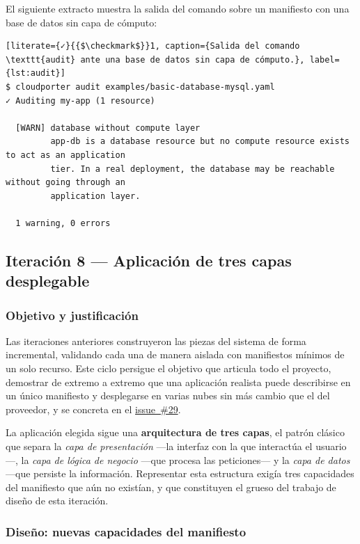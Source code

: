 El siguiente extracto muestra la salida del comando sobre un manifiesto con una base de datos
sin capa de cómputo:

\begin{lstlisting}[literate={✓}{{$\checkmark$}}1, caption={Salida del comando \texttt{audit} ante una base de datos sin capa de cómputo.}, label={lst:audit}]
$ cloudporter audit examples/basic-database-mysql.yaml
✓ Auditing my-app (1 resource)

  [WARN] database without compute layer
         app-db is a database resource but no compute resource exists to act as an application
         tier. In a real deployment, the database may be reachable without going through an
         application layer.

  1 warning, 0 errors
\end{lstlisting}

\subsection{Iteración 8 — Aplicación de tres capas desplegable}
\label{sec:iter8}

\subsubsection{Objetivo y justificación}

Las iteraciones anteriores construyeron las piezas del sistema de forma incremental, validando
cada una de manera aislada con manifiestos mínimos de un solo recurso. Este ciclo persigue el
objetivo que articula todo el proyecto, demostrar de extremo a extremo que una aplicación
realista puede describirse en un único manifiesto y desplegarse en varias nubes sin más cambio
que el del proveedor, y se concreta en el
\href{https://github.com/lucpez/cloudporter/issues/29}{issue~\#29}.

La aplicación elegida sigue una \textbf{arquitectura de tres capas}, el patrón clásico que separa
la \textit{capa de presentación} —la interfaz con la que interactúa el usuario—, la \textit{capa
de lógica de negocio} —que procesa las peticiones— y la \textit{capa de datos} —que persiste la
información. Representar esta estructura exigía tres capacidades del manifiesto que aún no
existían, y que constituyen el grueso del trabajo de diseño de esta iteración.

\subsubsection{Diseño: nuevas capacidades del manifiesto}

